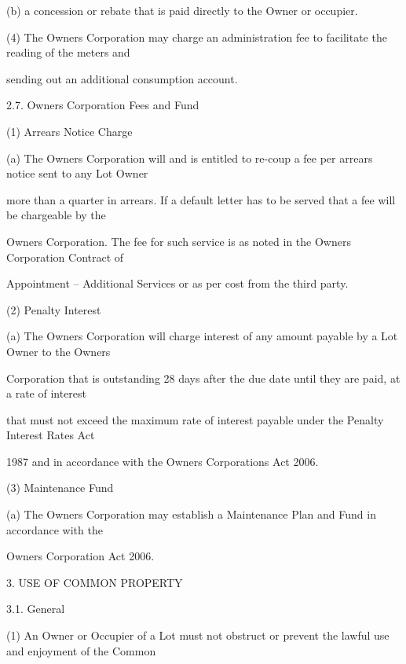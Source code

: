 \documentclass{article}
\begin{document}
{\fontsize{9.962}{1}(b) a concession or rebate that is paid directly to the Owner or occupier. }

\newpage

{\fontsize{9.962}{1}(4) The Owners Corporation may charge an administration fee to facilitate the reading of the meters and }

{\fontsize{10.02}{1}sending out an additional consumption account. }

{\fontsize{9.99}{1}2.7. Owners Corporation Fees and Fund }

{\fontsize{9.962}{1}(1) Arrears Notice Charge }

{\fontsize{9.962}{1}(a) The Owners Corporation will and is entitled to re-coup a fee per arrears notice sent to any Lot Owner }

{\fontsize{10.02}{1}more than a quarter in arrears. If a default letter has to be served that a fee will be chargeable by the }

{\fontsize{10.02}{1}Owners Corporation. The fee for such service is as noted in the Owners Corporation Contract of }

{\fontsize{10.02}{1}Appointment – Additional Services or as per cost from the third party. }

{\fontsize{9.962}{1}(2) Penalty Interest }

{\fontsize{9.962}{1}(a) The Owners Corporation will charge interest of any amount payable by a Lot Owner to the Owners }

{\fontsize{10.02}{1}Corporation that is outstanding 28 days after the due date until they are paid, at a rate of interest }

{\fontsize{10.02}{1}that must not exceed the maximum rate of interest payable under the Penalty Interest Rates Act }

{\fontsize{10.02}{1}1987 and in accordance with the Owners Corporations Act 2006. }

{\fontsize{9.962}{1}(3) Maintenance Fund }

{\fontsize{9.962}{1}(a) The Owners Corporation may establish a Maintenance Plan and Fund in accordance with the }

{\fontsize{10.02}{1}Owners Corporation Act 2006. }

{\fontsize{9.99}{1}3. USE OF COMMON PROPERTY }

{\fontsize{9.99}{1}3.1. General }

{\fontsize{9.962}{1}(1) An Owner or Occupier of a Lot must not obstruct or prevent the lawful use and enjoyment of the Common }
\end{document}
